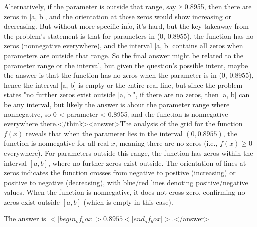 Alternatively, if the parameter is outside that range, say ≥ 0.8955, then there are zeros in [a, b], and the orientation at those zeros would show increasing or decreasing. But without more specific info, it's hard, but the key takeaway from the problem's statement is that for parameters in (0, 0.8955), the function has no zeros (nonnegative everywhere), and the interval [a, b] contains all zeros when parameters are outside that range. So the final answer might be related to the parameter range or the interval, but given the question's possible intent, maybe the answer is that the function has no zeros when the parameter is in (0, 0.8955), hence the interval [a, b] is empty or the entire real line, but since the problem states "no further zeros exist outside [a, b]", if there are no zeros, then [a, b] can be any interval, but likely the answer is about the parameter range where nonnegative, so 0 < parameter < 0.8955, and the function is nonnegative everywhere there.</think><answer>The analysis of the grid for the function \( f(x) \) reveals that when the parameter lies in the interval \( (0, 0.8955) \), the function is nonnegative for all real \( x \), meaning there are no zeros (i.e., \( f(x) \geq 0 \) everywhere). For parameters outside this range, the function has zeros within the interval \([a, b]\), where no further zeros exist outside. The orientation of lines at zeros indicates the function crosses from negative to positive (increasing) or positive to negative (decreasing), with blue/red lines denoting positive/negative values. When the function is nonnegative, it does not cross zero, confirming no zeros exist outside \([a, b]\) (which is empty in this case).  

The answer is \(<|begin_of_box|>0.8955<|end_of_box|>\).</answer>